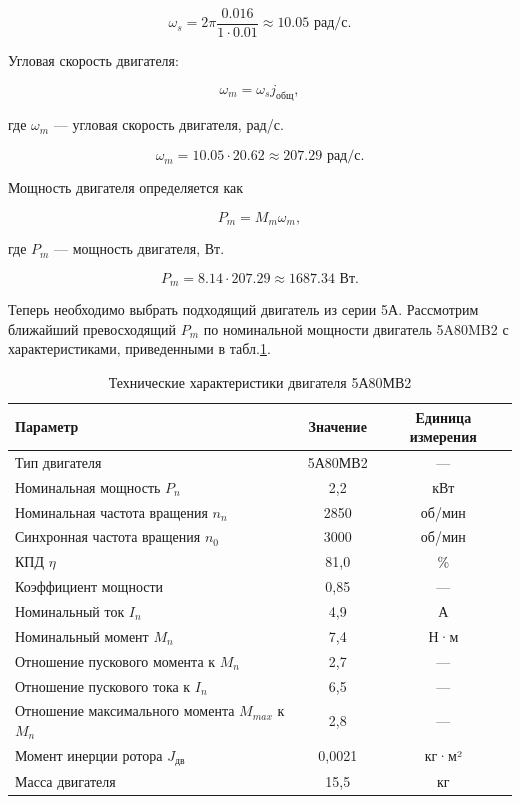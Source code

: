 \documentclass[a4paper, 14pt]{extarticle}
\begin{document}
	\[
	\omega_s =2\pi \frac{0.016}{1\cdot 0.01}\approx 10.05 \text{ рад/с}.
	\]
	
	Угловая скорость двигателя:
	
	\begin{equation}
		\omega_m = \omega_s j_{\text{общ}},
		\label{eq12}
	\end{equation}
	
	где $\omega_m$ — угловая скорость двигателя, рад/с.
	
	\[
	\omega_m =10.05 \cdot 20.62 \approx 207.29\text{ рад/с}.
	\]
	
	Мощность двигателя определяется как
	
	\begin{equation}
		P_m = M_m \omega_m,
		\label{eq13}
	\end{equation}
	
	где $P_m$ — мощность двигателя, Вт.
	
	\[
	P_m = 8.14 \cdot 207.29
	\approx 1687.34 \text{ Вт}.
	\]
	
	\par Теперь необходимо выбрать подходящий двигатель из серии 5А. Рассмотрим ближайший превосходящий $P_m$ по номинальной мощности двигатель 5A80MB2 с характеристиками,  приведенными в табл.\ref{tab:motor}.
	\begin{table}[h]
		\centering
		\caption{Технические характеристики двигателя 5А80МВ2}
		\label{tab:motor}
		\begin{tabular}{|l|c|c|}
			\hline
			\textbf{Параметр} & \textbf{Значение} & \textbf{Единица измерения} \\ \hline
			Тип двигателя & 5А80МВ2 & — \\
			Номинальная мощность \(P_n\) & 2,2 & кВт \\
			Номинальная частота вращения \(n_n\) & 2850 & об/мин \\
			Синхронная частота вращения \(n_0\) & 3000 & об/мин \\
			КПД \(\eta\) & 81,0 & \% \\
			Коэффициент мощности & 0,85 & —  \\
			Номинальный ток \(I_n\) & 4,9 & А \\
			Номинальный момент \(M_n\) & 7,4 & Н·м \\
			Отношение пускового момента к $M_n$ & 2,7 &  —  \\
			Отношение пускового тока к $I_n$& 6,5 &  —  \\
			Отношение максимального момента \(M_{max}\) к \(M_n\) & 2,8 & —  \\
			Момент инерции ротора \(J_{дв}\) & 0,0021 & кг·м² \\
			Масса двигателя & 15,5 & кг \\ \hline
		\end{tabular}
	\end{table}
	
\end{document}
